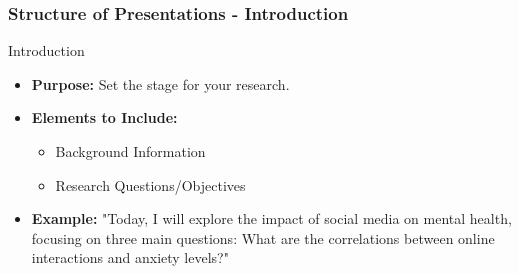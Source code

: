 \documentclass[aspectratio=169]{beamer}
\begin{document}
\begin{frame}[fragile]
    \frametitle{Structure of Presentations - Introduction}
    \begin{block}{Introduction}
        \begin{itemize}
            \item \textbf{Purpose:} Set the stage for your research.
            \item \textbf{Elements to Include:}
                \begin{itemize}
                    \item Background Information
                    \item Research Questions/Objectives
                \end{itemize}
            \item \textbf{Example:} 
                "Today, I will explore the impact of social media on mental health, focusing on three main questions: 
                What are the correlations between online interactions and anxiety levels?"
        \end{itemize}
    \end{block}
\end{frame}
\end{document}

